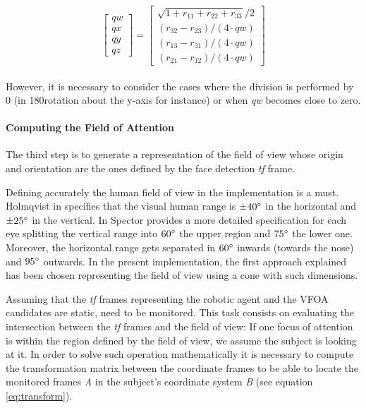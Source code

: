 \documentclass{sig-alternate}
\begin{document}
\begin{equation}
\begin{bmatrix}
qw \\
qx \\
qy \\
qz
\end{bmatrix}
=
\begin{bmatrix}
\sqrt{1 + r_{11} + r_{22} + r_{33}} /2 \\
(r_{32} - r_{23})/( 4 \cdot qw) \\
(r_{13} - r_{31})/( 4 \cdot qw) \\
(r_{21} - r_{12})/( 4 \cdot qw)
\end{bmatrix}
\label{eq:quat}
\end{equation}
\\
However, it is necessary to consider the cases where the division is performed
by 0 (in 180\degree rotation about the y-axis for instance) or when \textit{qw}
becomes close to zero.

\paragraph{Computing the Field of Attention}

The third step is to generate a representation of the field of view whose origin
and orientation are the ones defined by the face detection \textit{tf} frame. 

Defining accurately the human field of view in the implementation is a must.
Holmqvist in \cite{holmqvist2011eye} specifies that the visual human range is $
\pm  40\degree $ in the horizontal and $ \pm 25\degree $ in the vertical. In
\cite{walker1980clinical} Spector provides a more detailed specification for
each eye splitting the vertical range into $ 60\degree $ the upper region and $
75\degree $ the lower one. Moreover, the horizontal range gets separated in $
60\degree $ inwards (towards the nose) and $ 95\degree $ outwards. In the
present implementation, the first approach explained has been chosen
representing the field of view using a cone with such dimensions.

Assuming that the \textit{tf} frames representing the robotic agent and the VFOA
candidates are static, need to be monitored. This task consists on evaluating
the intersection between the \textit{tf} frames and the field of view: If one
focus of attention is within the region defined by the field of view, we assume
the subject is looking at it. In order to solve such operation mathematically it
is necessary to compute the transformation matrix between the coordinate frames
to be able to locate the monitored frames \textit{A} in the subject's coordinate
system \textit{B} (see equation \ref{eq:transform}).
\end{document}
